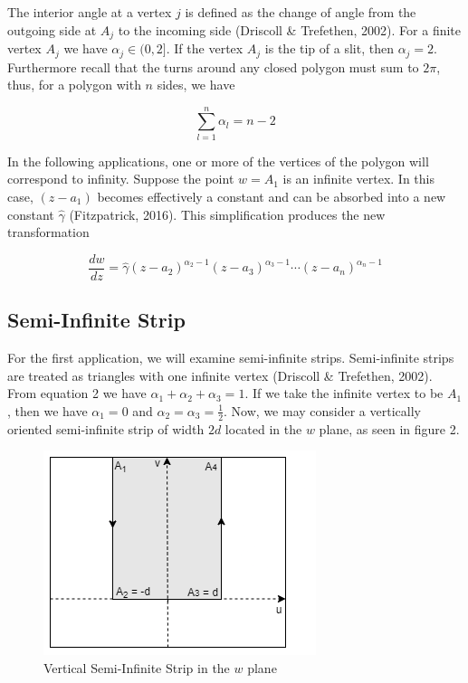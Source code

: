 \documentclass{article}
\begin{document}
        The interior angle at a vertex $j$ is defined as the change of angle from the outgoing side at \(A_{j}\) to the incoming side (Driscoll \& Trefethen, 2002). For a finite vertex \(A_{j}\) we have \( \alpha_{j} \in (0, 2]\). If the vertex \(A_{j}\) is the tip of a slit, then \(\alpha_{j} = 2\). Furthermore recall that the turns around any closed polygon must sum to \(2\pi\), thus, for a polygon with $n$ sides, we have
        
        \begin{equation}
            \sum_{l = 1}^{n} \alpha_{l} = n - 2
        \end{equation}
        
        In the following applications, one or more of the vertices of the polygon will correspond to infinity. Suppose the point \(w = A_{1}\) is an infinite vertex. In this case, \((z-a_{1})\) becomes effectively a constant and can be absorbed into a new constant \(\hat{\gamma}\) (Fitzpatrick, 2016). This simplification produces the new transformation
        
        \begin{equation}
            \frac{dw}{dz} = \hat{\gamma}(z-a_{2})^{\alpha_{2} - 1}(z-a_{3})^{\alpha_{3} - 1}\cdots (z-a_{n})^{\alpha_{n}-1}
        \end{equation}
    

\subsection{Semi-Infinite Strip}
  For the first application, we will examine semi-infinite strips. Semi-infinite strips are treated as triangles with one infinite vertex (Driscoll \& Trefethen, 2002). From equation 2 we have \(\alpha_{1} + \alpha_{2} + \alpha_{3} = 1\). If we take the infinite vertex to be $A_{1}$, then we have \(\alpha_{1} = 0\) and \(\alpha_{2} = \alpha_{3} = \frac{1}{2}\). Now, we may consider a vertically oriented semi-infinite strip of width \(2d\) located in the $w$ plane, as seen in figure 2.
    
    \begin{figure}
        \centering            
        \includegraphics[scale = .75 ]{Verticle strip.png}
        \caption{Vertical Semi-Infinite Strip in the $w$ plane}
        \label{fig:my_label}
    \end{figure}
    
\end{document}

